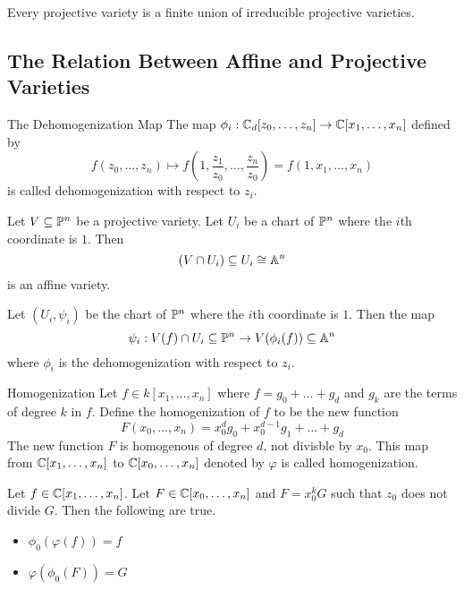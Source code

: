 \documentclass[a4paper]{article}
\begin{document}
\begin{prp}{}{} Every projective variety is a finite union of irreducible projective varieties. 
\end{prp}

\subsection{The Relation Between Affine and Projective Varieties}
\begin{defn}{The Dehomogenization Map}{} The map $\phi_i:\mathbb{C}_d[z_0,\dots,z_n]\to\mathbb{C}[x_1,\dots,x_n]$ defined by $$f(z_0,\dots,z_n)\mapsto f\left(1,\frac{z_1}{z_0},\dots,\frac{z_n}{z_0}\right)=f(1,x_1,\dots,x_n)$$ is called dehomogenization with respect to $z_i$. 
\end{defn}

\begin{lmm}{}{} Let $V\subseteq\mathbb{P}^n$ be a projective variety. Let $U_i$ be a chart of $\mathbb{P}^n$ where the $i$th coordinate is $1$. Then $$(V\cap U_i)\subseteq U_i\cong\mathbb{A}^n$$ is an affine variety. 
\end{lmm}

\begin{thm}{}{} Let $(U_i,\psi_i)$ be the chart of $\mathbb{P}^n$ where the $i$th coordinate is $1$. Then the map $$\psi_i:V(f)\cap U_i\subseteq\mathbb{P}^n\to V(\phi_i(f))\subseteq\mathbb{A}^n$$ where $\phi_i$ is the dehomogenization with respect to $z_i$. 
\end{thm}

\begin{defn}{Homogenization}{} Let $f\in k[x_1,\dots,x_n]$ where $f=g_0+\dots+g_d$ and $g_k$ are the terms of degree $k$ in $f$. Define the homogenization of $f$ to be the new function $$F(x_0,\dots,x_n)=x_0^dg_0+x_0^{d-1}g_1+\dots+g_d$$ The new function $F$ is homogenous of degree $d$, not divisble by $x_0$. This map from $\mathbb{C}[x_1,\dots,x_n]$ to $\mathbb{C}[x_0,\dots,x_n]$ denoted by $\varphi$ is called homogenization. 
\end{defn}

\begin{thm}{}{} Let $f\in\mathbb{C}[x_1,\dots,x_n]$. Let $F\in\mathbb{C}[x_0,\dots,x_n]$ and $F=x_0^kG$ such that $z_0$ does not divide $G$. Then the following are true. 
\begin{itemize}
\item $\phi_0(\varphi(f))=f$
\item $\varphi(\phi_0(F))=G$
\end{itemize}
\end{thm}
\end{document}
